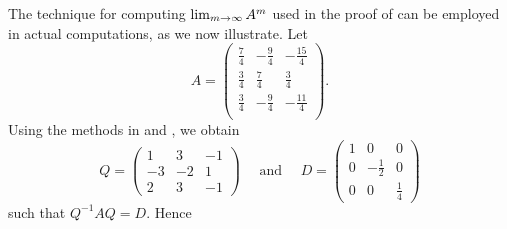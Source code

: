 The technique for computing \(\lim_{m \to \infty} A^m\) used in the proof of  can be employed in actual computations, as we now illustrate.
Let
\[
    A = \begin{pmatrix}
        \frac{7}{4} & -\frac{9}{4} & -\frac{15}{4} \\
        \frac{3}{4} & \frac{7}{4}  & \frac{3}{4} \\
        \frac{3}{4} & -\frac{9}{4}  & -\frac{11}{4} \\
    \end{pmatrix}.
\]
Using the methods in  and , we obtain
\[
    Q = \begin{pmatrix}
        1 & 3 & -1 \\
        -3 & -2 & 1 \\
        2 & 3 & -1
    \end{pmatrix}
    \quad \text{ and } \quad
    D = \begin{pmatrix}
        1 & 0 & 0 \\
        0 & -\frac{1}{2} & 0 \\
        0 & 0 & \frac{1}{4}
    \end{pmatrix}
\]
such that \(Q^{-1} A Q = D\).
Hence
